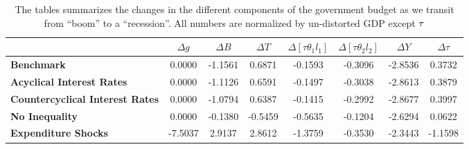 \documentclass[thmsb,11pt]{article}
\begin{document}
{\begin{table}[tbp]
\begin{tabular}{|l|c|c|c|c|c|c|c|}
\hline
& \textbf{$\Delta g$} & \textbf{$\Delta B$} & \textbf{$\Delta T$} & \textbf{$%
\Delta [\tau\theta_1l_1]$} & \textbf{$\Delta [\tau\theta_2l_2]$} & \textbf{$%
\Delta Y$} & \textbf{$\Delta \tau$} \\ \hline
\textbf{Benchmark} & 0.0000 & -1.1561 & 0.6871 & -0.1593 & -0.3096 & -2.8536
& 0.3732 \\ \hline
\textbf{Acyclical Interest Rates} & 0.0000 & -1.1126 & 0.6591 & -0.1497 &
-0.3038 & -2.8613 & 0.3879 \\ \hline
\textbf{Countercyclical Interest Rates} & 0.0000 & -1.0794 & 0.6387 & -0.1415 &
-0.2992 & -2.8677 & 0.3997 \\ \hline
\textbf{No Inequality} & 0.0000 & -0.1380 & -0.5459 & -0.5635 & -0.1204 &
-2.6294 & 0.0622 \\ \hline
\textbf{Expenditure Shocks} & -7.5037 & 2.9137 & 2.8612 & -1.3759 & -0.3530 & -2.3443 &
-1.1598 \\ \hline
\end{tabular}%
\caption{The tables summarizes the changes in the different components of the government budget as we transit from ``boom'' to a ``recession''.  All numbers are normalized by un-distorted GDP except $\protect\tau $
}


\end{table}}
\end{document}
